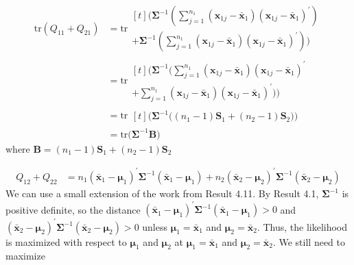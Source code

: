 \begin{align*}
    \text{tr}(Q_{11} + Q_{21})
    & =
    \text{tr}
    \begin{multlined}[t]
        \Bigg(
            \bm{\Sigma}^{-1}
        \left(
            \sum_{j=1}^{n_{1}}
            (\textbf{x}_{1j} - \bar{\textbf{x}}_{1})
            {(\textbf{x}_{1j} - \bar{\textbf{x}}_{1})}^{\prime}
        \right)
        \\
        +
        \bm{\Sigma}^{-1}
        \left(
            \sum_{j=1}^{n_{1}}
            (\textbf{x}_{1j} - \bar{\textbf{x}}_{1})
            {(\textbf{x}_{1j} - \bar{\textbf{x}}_{1})}^{\prime}
        \right)
        \Bigg)
    \end{multlined}
    \\
    &=
    \text{tr}
    \begin{multlined}[t]
        \Bigg(
            \bm{\Sigma}^{-1}
            \Bigg(
                \sum_{j=1}^{n_{1}}
                (\textbf{x}_{1j} - \bar{\textbf{x}}_{1})
                {(\textbf{x}_{1j} - \bar{\textbf{x}}_{1})}^{\prime}
            \\
            +
                \sum_{j=1}^{n_{1}}
                (\textbf{x}_{1j} - \bar{\textbf{x}}_{1})
                {(\textbf{x}_{1j} - \bar{\textbf{x}}_{1})}^{\prime}
            \Bigg)
        \Bigg)
    \end{multlined}
    \\
    &=
    \text{tr}
    \begin{multlined}[t]
        \Bigg(
            \bm{\Sigma}^{-1}
            \Bigg(
                (n_{1} - 1) \textbf{S}_{1}
                +
                (n_{2} - 1) \textbf{S}_{2}
            \Bigg)
        \Bigg)
    \end{multlined}
    \\
    & =
    \text{tr}
    \Bigg(
        \bm{\Sigma}^{-1}
        \textbf{B}
    \Bigg)
\end{align*}
where $\textbf{B} = (n_{1} - 1) \textbf{S}_{1}
+
(n_{2} - 1) \textbf{S}_{2}$

\begin{align*}
    Q_{12} + Q_{22}
    & =
    n_{1}
    {(\bar{\textbf{x}}_{1} - \bm{\mu}_{1})}^{\prime}
    \bm{\Sigma}^{-1}
    (\bar{\textbf{x}}_{1} - \bm{\mu}_{1})
    +
    n_{2}
    {(\bar{\textbf{x}}_{2} - \bm{\mu}_{2})}^{\prime}
    \bm{\Sigma}^{-1}
    (\bar{\textbf{x}}_{2} - \bm{\mu}_{2})
\end{align*}
We can use a small extension of the work from Result 4.11. By Result 4.1,
$\bm{\Sigma}^{-1}$ is positive definite, so the distance ${(\bar{\textbf{x}}_{1} - \bm{\mu}_{1})}^{\prime}
\bm{\Sigma}^{-1}
(\bar{\textbf{x}}_{1} - \bm{\mu}_{1}) > 0$ and ${(\bar{\textbf{x}}_{2} - \bm{\mu}_{2})}^{\prime}
\bm{\Sigma}^{-1}
(\bar{\textbf{x}}_{2} - \bm{\mu}_{2}) > 0$ unless $\bm{\mu}_{1} = \bar{\textbf{x}}_{1}$ and $\bm{\mu}_{2} = \bar{\textbf{x}}_{2}$. Thus, the likelihood is maximized with respect to $\bm{\mu}_{1}$ and $\bm{\mu}_{2}$ at $\bm{\mu}_{1} = \bar{\textbf{x}}_{1}$ and $\bm{\mu}_{2} = \bar{\textbf{x}}_{2}$. We still need to maximize

